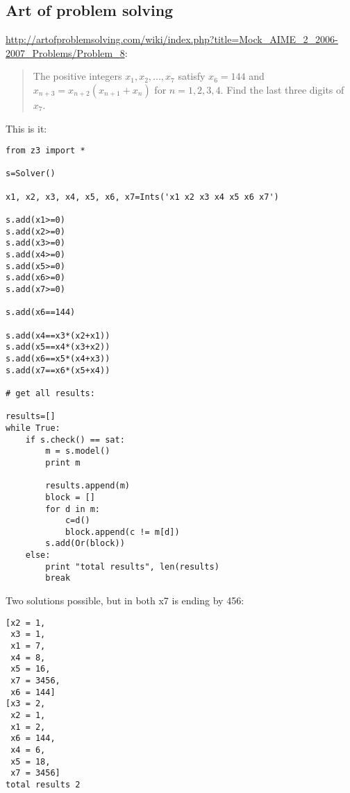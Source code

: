 \subsection{Art of problem solving}

\url{http://artofproblemsolving.com/wiki/index.php?title=Mock_AIME_2_2006-2007_Problems/Problem_8}:

\begin{framed}
\begin{quotation}
The positive integers $x_1, x_2, ... , x_7$ satisfy $x_6 = 144$ and $x_{n+3} = x_{n+2}(x_{n+1}+x_n)$ for $n = 1, 2, 3, 4$. Find the last three digits of $x_7$.
\end{quotation}
\end{framed}

This is it:

\begin{lstlisting}[style=custompy]
from z3 import *

s=Solver()

x1, x2, x3, x4, x5, x6, x7=Ints('x1 x2 x3 x4 x5 x6 x7')

s.add(x1>=0)
s.add(x2>=0)
s.add(x3>=0)
s.add(x4>=0)
s.add(x5>=0)
s.add(x6>=0)
s.add(x7>=0)

s.add(x6==144)

s.add(x4==x3*(x2+x1))
s.add(x5==x4*(x3+x2))
s.add(x6==x5*(x4+x3))
s.add(x7==x6*(x5+x4))

# get all results:

results=[]
while True:
    if s.check() == sat:
        m = s.model()
        print m

        results.append(m)
        block = []
        for d in m:
            c=d()
            block.append(c != m[d])
        s.add(Or(block))
    else:
        print "total results", len(results)
        break
\end{lstlisting}

Two solutions possible, but in both x7 is ending by 456:

\begin{lstlisting}
[x2 = 1,
 x3 = 1,
 x1 = 7,
 x4 = 8,
 x5 = 16,
 x7 = 3456,
 x6 = 144]
[x3 = 2,
 x2 = 1,
 x1 = 2,
 x6 = 144,
 x4 = 6,
 x5 = 18,
 x7 = 3456]
total results 2
\end{lstlisting}

